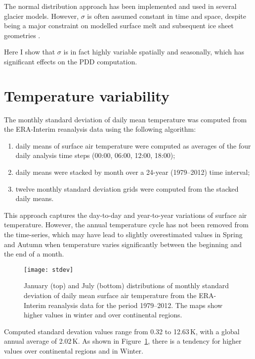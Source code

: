 \documentclass[review]{igs}
\begin{document}
The normal distribution approach has been implemented and used in several glacier models. However, $\sigma$ is often assumed constant in time and space, despite being a major constraint on modelled surface melt and subsequent ice sheet geometries \citep{charbit-etal-2013}.

Here I show that $\sigma$ is in fact highly variable spatially and seasonally, which has significant effects on the PDD computation.


\section{Temperature variability}

The monthly standard deviation of daily mean temperature was computed from the ERA-Interim reanalysis \citep{data:erai} data using the following algorithm:

\begin{enumerate}
  \item daily means of surface air temperature were computed as averages of the four daily analysis time steps (00:00, 06:00, 12:00, 18:00);
  \item daily means were stacked by month over a 24-year (1979--2012) time interval;
  \item twelve monthly standard deviation grids were computed from the stacked daily means.
\end{enumerate}

This approach captures the day-to-day and year-to-year variations of surface air temperature. However, the annual temperature cycle has not been removed from the time-series, which may have lead to slightly overestimated values in Spring and Autumn when temperature varies significantly between the beginning and the end of a month.

\begin{figure}
  \centering\texttt{[image: stdev]}
  \caption{January (top) and July (bottom) distributions of monthly standard deviation of daily mean surface air temperature from the ERA-Interim reanalysis \citep{data:erai} data for the period 1979--2012. The maps show higher values in winter and over continental regions.}
  \label{fig:stdev}
\end{figure}

Computed standard devation values range from 0.32 to 12.63\,K, with a global annual average of 2.02\,K. As shown in Figure~\ref{fig:stdev}, there is a tendency for higher values over continental regions and in Winter.
\end{document}
